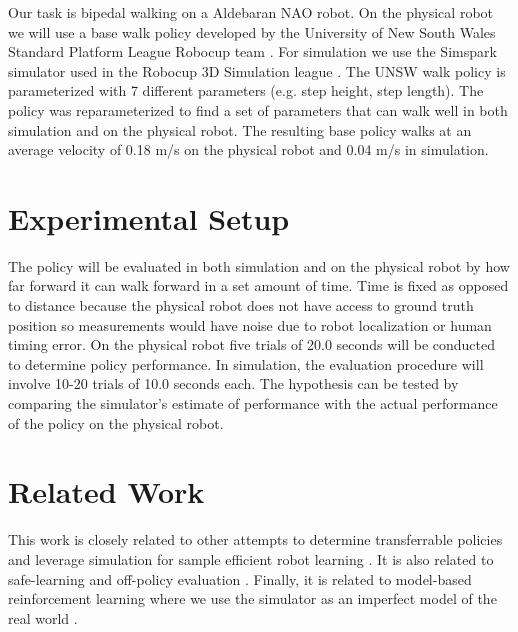 \documentclass[11 pt]{article}
\begin{document}
Our task is bipedal walking on a Aldebaran NAO robot. On the physical robot we will use a base walk policy developed by the University of New South Wales Standard Platform League Robocup team \cite{ashar2014robocup}. For simulation we use the Simspark simulator used in the Robocup 3D Simulation league \cite{simspark}. The UNSW walk policy is parameterized with 7 different parameters (e.g. step height, step length). The policy was reparameterized to find a set of parameters that can walk well in both simulation and on the physical robot. The resulting base policy walks at an average velocity of 0.18 m/s on the physical robot and 0.04 m/s in simulation.

\section{Experimental Setup}

The policy will be evaluated in both simulation and on the physical robot by how far forward it can walk forward in a set amount of time. Time is fixed as opposed to distance because the physical robot does not have access to ground truth position so measurements would have noise due to robot localization or human timing error. On the physical robot five trials of 20.0 seconds will be conducted to determine policy performance. In simulation, the evaluation procedure will involve 10-20 trials of 10.0 seconds each. The hypothesis can be tested by comparing the simulator's estimate of performance with the actual performance of the policy on the physical robot. 

\section{Related Work}

This work is closely related to other attempts to determine transferrable policies and leverage simulation for sample efficient robot learning \cite{koos2010crossing} \cite{cutler2014reinforcement}. It is also related to safe-learning and off-policy evaluation \cite{thomas2015off-policy} \cite{thomas2015policy}. Finally, it is related to model-based reinforcement learning where we use the simulator as an imperfect model of the real world \cite{kupcsik2013data} \cite{deisenroth2011pilco}.



\end{document}
